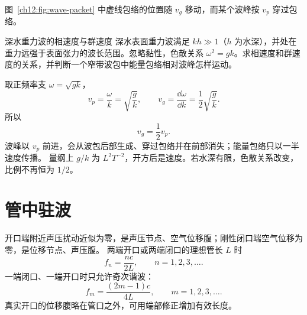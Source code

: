 \begin{center}
\label{ch12:fig:wave-packet}
\end{center}
图~\ref{ch12:fig:wave-packet} 中虚线包络的位置随 $v_g$ 移动，而某个波峰按 $v_p$ 穿过包络。

\begin{origexamplebox}{深水重力波的相速度与群速度}
\label{ch12:ex:06}
深水表面重力波满足 $kh\gg1$（$h$ 为水深），并处在重力远强于表面张力的波长范围。忽略黏性，色散关系 $\omega^2=gk$。求相速度和群速度的关系，并判断一个窄带波包中能量包络相对波峰怎样运动。
\end{origexamplebox}
\begin{xesolution}
取正频率支 $\omega=\sqrt{gk}$，
\[
 v_p=\frac\omega k=\sqrt{\frac gk},
 \qquad
 v_g=\frac{\dd\omega}{\dd k}=\frac12\sqrt{\frac gk}.
\]
所以
\[
 \boxed{v_g=\frac12v_p}.
\]
波峰以 $v_p$ 前进，会从波包后部生成、穿过包络并在前部消失；能量包络只以一半速度传播。
量纲上 $g/k$ 为 $L^2T^{-2}$，开方后是速度。若水深有限，色散关系改变，比例不再恒为 $1/2$。
\end{xesolution}


\section{管中驻波}

开口端附近声压扰动近似为零，是声压节点、空气位移腹；刚性闭口端空气位移为零，是位移节点、声压腹。
两端开口或两端闭口的理想管长 $L$ 时
\begin{equation}
 f_n=\frac{nc}{2L},\qquad n=1,2,3,\ldots.
\end{equation}
一端闭口、一端开口时只允许奇次谐波：
\begin{equation}
 f_m=\frac{(2m-1)c}{4L},\qquad m=1,2,3,\ldots.
\end{equation}
真实开口的位移腹略在管口之外，可用端部修正增加有效长度。

